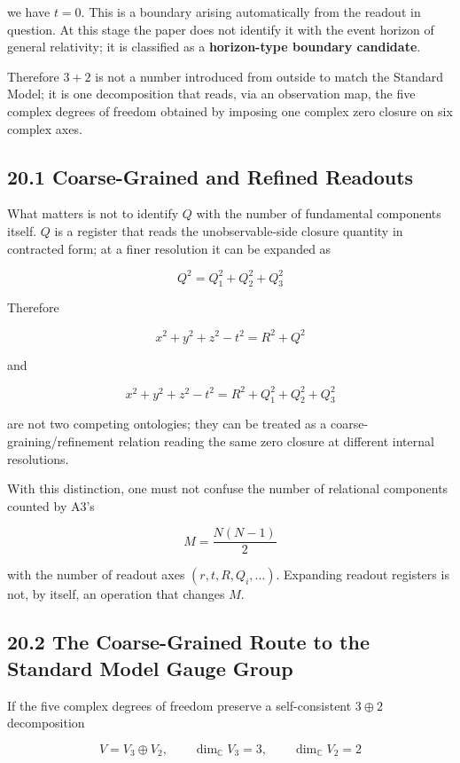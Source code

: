 \documentclass[
  a4paper,
]{article}
\begin{document}
we have \(t=0\). This is a boundary arising automatically from the
readout in question. At this stage the paper does not identify it with
the event horizon of general relativity; it is classified as a
\textbf{horizon-type boundary candidate}.

Therefore \(3+2\) is not a number introduced from outside to match the
Standard Model; it is one decomposition that reads, via an observation
map, the five complex degrees of freedom obtained by imposing one
complex zero closure on six complex axes.

\subsection{20.1 Coarse-Grained and Refined
Readouts}\label{coarse-grained-and-refined-readouts}

What matters is not to identify \(Q\) with the number of fundamental
components itself. \(Q\) is a register that reads the unobservable-side
closure quantity in contracted form; at a finer resolution it can be
expanded as

\[
\boxed{Q^2=Q_1^2+Q_2^2+Q_3^2}
\]

Therefore

\[
x^2+y^2+z^2-t^2=R^2+Q^2
\]

and

\[
\boxed{x^2+y^2+z^2-t^2=R^2+Q_1^2+Q_2^2+Q_3^2}
\]

are not two competing ontologies; they can be treated as a
coarse-graining/refinement relation reading the same zero closure at
different internal resolutions.

With this distinction, one must not confuse the number of relational
components counted by A3's

\[
M=\frac{N(N-1)}2
\]

with the number of readout axes \((r,t,R,Q_i,\ldots)\). Expanding
readout registers is not, by itself, an operation that changes \(M\).

\subsection{20.2 The Coarse-Grained Route to the Standard Model Gauge
Group}\label{the-coarse-grained-route-to-the-standard-model-gauge-group}

If the five complex degrees of freedom preserve a self-consistent
\(3\oplus2\) decomposition

\[
V=V_3\oplus V_2,
\qquad
\dim_{\mathbb C}V_3=3,
\qquad
\dim_{\mathbb C}V_2=2
\]
\end{document}
